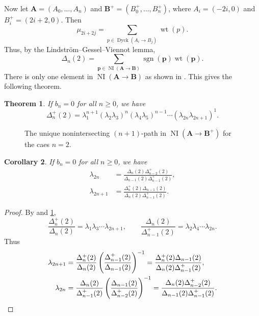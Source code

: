 \documentclass[oneside]{book}
\numberwithin{equation}{section}
\newtheorem{thm}{Theorem}[section]
\newtheorem{cor}[thm]{Corollary}
\theoremstyle{definition}
\newcommand\NI{\operatorname{NI}}
\newcommand\sgn{\operatorname{sgn}}
\newcommand{\Dyck}{\operatorname{Dyck}}
\newcommand\wt{\operatorname{wt}}
\renewcommand\vec[1]{\mathbf{#1}}
\newcommand\dlabel[3]{\node at (#1+0.7,#2-0.3) {\( #3 \)};}
\begin{document}
Now let \( \vec A = (A_0,\dots,A_n) \) and \( \vec B^+ = (B^+_0,\dots,B^+_n) \),
where \( A_i = (-2i,0) \) and \( B^+_i = (2i+2,0) \). Then
\[
  \mu_{2i+2j} = \sum_{p\in \Dyck(A_i\to B_j)} \wt(p). 
\]
Thus, by the Lindstr\"om--Gessel--Viennot lemma,
\[
  \Delta_n(2) = \sum_{\vec p \in \NI(\vec A \to \vec B)} \sgn(\vec p) \wt(\vec p).
\]
There is only one element in \( \NI(\vec A \to \vec B) \) as shown in
.
This gives the following theorem.
\begin{thm}\label{thm:12}
  If \( b_n=0 \) for all \( n\ge0 \), we have
\[
  \Delta^+_n(2) = \lambda_1^{n+1} (\lambda_2\lambda_3)^{n} (\lambda_4\lambda_5)^{n-1}
  \cdots  (\lambda_{2n}\lambda_{2n+1})^1.
\]
\end{thm}




\begin{figure}
  \centering
{}
\caption{The unique nonintersecting \( (n+1) \)-path in
  \( \NI(\vec A \to \vec B^+) \) for the caes \( n=2 \).}
\label{fig:17}
\end{figure}


\begin{cor}\label{cor:5}
  If \( b_n=0 \) for all \( n\ge0 \), we have
  \begin{align*}
  \lambda_{2n} &= \frac{\Delta_n(2)\Delta^+_{n-2}(2)}{\Delta_{n-1}(2)\Delta^+_{n-1}(2)}, \\
  \lambda_{2n+1} &= \frac{\Delta^+_n(2)\Delta_{n-1}(2)}{\Delta_{n}(2)\Delta^+_{n-1}(2)}.
  \end{align*}
\end{cor}

\begin{proof}
By  and \ref{thm:12},
\[
\frac{\Delta^+_n(2)}{\Delta_{n}(2)}  = \lambda_1 \lambda_3 \cdots \lambda_{2n+1}, \qquad  
\frac{\Delta_n(2)}{\Delta^+_{n-1}(2)}  = \lambda_2 \lambda_4 \cdots \lambda_{2n}.
\]
Thus
\begin{align*}
  \lambda_{2n+1}
  &= \frac{\Delta^+_n(2)}{\Delta_{n}(2)} \left( \frac{\Delta^+_{n-1}(2)}{\Delta_{n-1}(2)} \right)^{-1}
    = \frac{\Delta^+_n(2)\Delta_{n-1}(2)}{\Delta_{n}(2)\Delta^+_{n-1}(2)},\\
  \lambda_{2n}
  &= \frac{\Delta_n(2)}{\Delta^+_{n-1}(2)} \left( \frac{\Delta_{n-1}(2)}{\Delta^+_{n-2}(2)} \right)^{-1}
    = \frac{\Delta_n(2)\Delta^+_{n-2}(2)}{\Delta_{n-1}(2)\Delta^+_{n-1}(2)}.
    \qedhere
\end{align*}

\end{proof}
\end{document}
